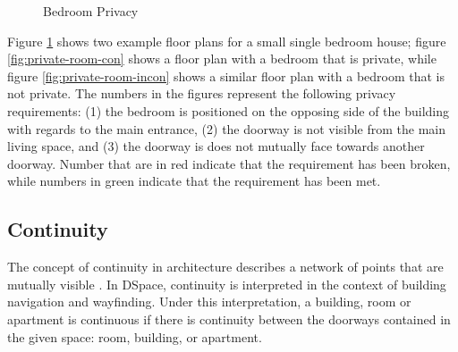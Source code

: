\documentclass[12pt]{ucthesis}
\begin{document}
\begin{figure}[H]
 \centering
  \hspace{10 mm}
 \caption{Bedroom Privacy}
\label{room-privacy}
\end{figure}

Figure \ref{room-privacy} shows two example floor plans for a small single bedroom house; figure \ref{fig:private-room-con} shows a floor plan with a bedroom that is  private, while figure \ref{fig:private-room-incon} shows a similar floor plan with a bedroom that is not private. The numbers in the figures represent the following privacy requirements: (1) the bedroom is positioned on the opposing side of the building with regards to the main entrance, (2) the doorway is not visible from the main living space, and (3) the doorway is does not mutually face towards another doorway. Number that are in red indicate that the requirement has been broken, while numbers in green indicate that the requirement has been met.


\subsection{Continuity}
The concept of continuity in architecture describes a network of points that are mutually visible \cite{Key}. In DSpace, continuity is interpreted in the context of building navigation and wayfinding. Under this interpretation, a building, room or apartment is continuous if there is continuity between the doorways contained in the given space: room, building, or apartment. 
\end{document}
